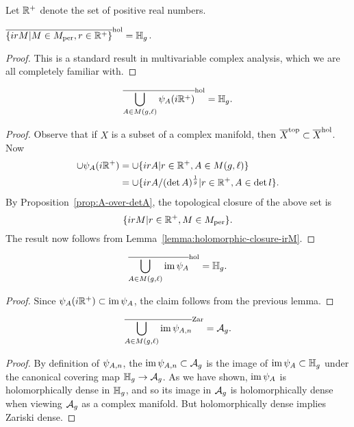 \documentclass{amsart}
\begin{document}
Let $\mathbb{R}^+$ denote the set of positive real numbers.
\begin{lemma}\label{lemma:holomorphic-closure-irM}
  $\overline{\{ irM | M \in M_{\textrm{per}}, r \in \mathbb{R}^+\}}^\mathrm{hol} = \mathbb{H}_g$.
\end{lemma}

\begin{proof}
  This is a standard result in multivariable complex analysis, which we are all completely familiar with.
\end{proof}

\begin{lemma}
  \[
    \overline{\bigcup_{A \in M(g,\ell)} \psi_A(i\mathbb{R}^+)}^\mathrm{hol} = \mathbb{H}_g.
  \]
\end{lemma}

\begin{proof}
  Observe that if $X$ is a subset of a complex manifold, then $\overline{X}^\mathrm{top} \subset \overline{X}^\mathrm{hol}$. Now
  \begin{align*}
    \cup \psi_A(i\mathbb{R}^+) &= \cup \{irA | r \in \mathbb{R}^+, A \in M(g,\ell)\} \\
               &= \cup \{irA/(\det A)^{\frac{1}{g}} | r \in \mathbb{R}^+, A \in \det l\}.
  \end{align*}
  By Proposition~\ref{prop:A-over-detA}, the topological closure of the above set is
  \[
    \{irM | r \in \mathbb{R}^+, M \in M_{\textrm{per}}\}.
  \]
  The result now follows from Lemma~\ref{lemma:holomorphic-closure-irM}.
\end{proof}

\begin{lemma}
  \[
    \overline{\bigcup_{A \in M(g,\ell)} \operatorname{im} \psi_A}^\mathrm{hol} = \mathbb{H}_g.
  \]
\end{lemma}

\begin{proof}
  Since $\psi_A(i\mathbb{R}^+) \subset \operatorname{im} \psi_A$, the claim follows from the previous lemma.
\end{proof}

\begin{proposition}
  \[
    \overline{\bigcup_{A \in M(g,\ell)} \operatorname{im} \psi_{A,n}}^\mathrm{Zar} = \mathcal{A}_g.
  \]
\end{proposition}

\begin{proof}
  By definition of $\psi_{A,n}$, the $\operatorname{im} \psi_{A,n} \subset \mathcal{A}_g$ is the image of $\operatorname{im} \psi_A \subset \mathbb{H}_g$ under the canonical covering map $\mathbb{H}_g \to \mathcal{A}_g$. As we have shown, $\operatorname{im} \psi_A$ is holomorphically dense in $\mathbb{H}_g$, and so its image in $\mathcal{A}_g$ is holomorphically dense when viewing $\mathcal{A}_g$ as a complex manifold. But holomorphically dense implies Zariski dense.
\end{proof}
\end{document}
